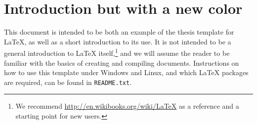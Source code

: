 \chapter{Introduction but with a new color}
\label{chapter_2}

\noindent This document is intended to be both an example of the thesis template for \LaTeX, as well as a short introduction to its use. It is not intended to be a general introduction to \LaTeX{} itself,\footnote{We recommend \url{http://en.wikibooks.org/wiki/LaTeX} as a reference and a starting point for new users.} and we will assume the reader to be familiar with the basics of creating and compiling documents. Instructions on how to use this template under Windows and Linux, and which \LaTeX{} packages are required, can be found in \texttt{README.txt}.
